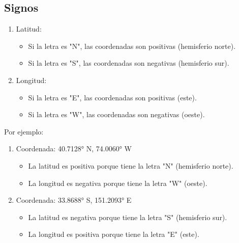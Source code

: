\documentclass[
	12pt, %
	fleqn, %
	a4paper, %
	oneside, %
]{LegrandOrangeBook}
\begin{document}
\subsection*{Signos}
\begin{enumerate}
\item Latitud:
\begin{itemize}
\item Si la letra es "N", las coordenadas son positivas (hemisferio norte).
\item Si la letra es "S", las coordenadas son negativas (hemisferio sur).
\end{itemize}

\item Longitud:
\begin{itemize}
\item Si la letra es "E", las coordenadas son positivas (este).
\item Si la letra es "W", las coordenadas son negativas (oeste).
\end{itemize}
\end{enumerate}

Por ejemplo:
\begin{enumerate}
\item Coordenada: 40.7128° N, 74.0060° W
\begin{itemize}
\item La latitud es positiva porque tiene la letra "N" (hemisferio norte).
\item La longitud es negativa porque tiene la letra "W" (oeste).
\end{itemize}

\item Coordenada: 33.8688° S, 151.2093° E
\begin{itemize}
\item La latitud es negativa porque tiene la letra "S" (hemisferio sur).
\item La longitud es positiva porque tiene la letra "E" (este).
\end{itemize}
\end{enumerate}
\end{document}

